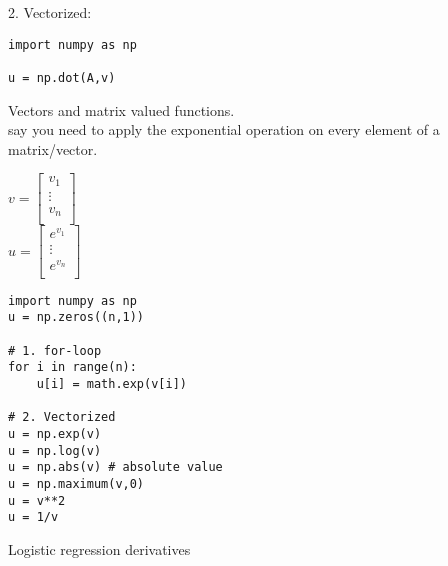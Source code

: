 \documentclass{article}
\begin{document}
2. Vectorized:\\

\lstset{language=Python}
\begin{lstlisting}
import numpy as np

u = np.dot(A,v)
\end{lstlisting}

Vectors and matrix valued functions.\\
    say you need to apply the exponential operation on every element of a matrix/vector.

$v =
\begin{bmatrix}
v_1\\
\vdots\\
v_n\\
\end{bmatrix}
$\\

$u =
\begin{bmatrix}
e^{v_1}\\
\vdots\\
e^{v_n}\\
\end{bmatrix}
$\\

\lstset{language=Python}
\begin{lstlisting}
import numpy as np
u = np.zeros((n,1))

# 1. for-loop
for i in range(n):
    u[i] = math.exp(v[i])

# 2. Vectorized
u = np.exp(v)
u = np.log(v)
u = np.abs(v) # absolute value
u = np.maximum(v,0)
u = v**2
u = 1/v
\end{lstlisting}


Logistic regression derivatives\\
\end{document}
